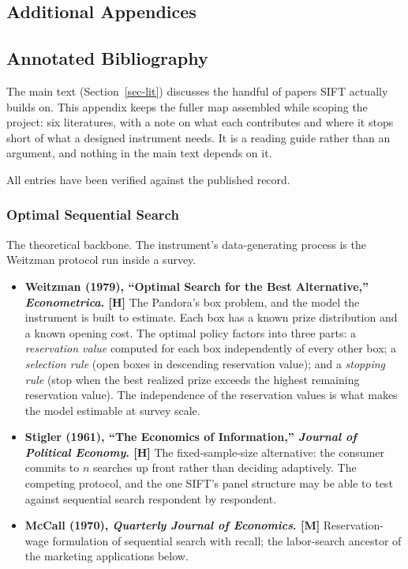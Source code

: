 \documentclass[
  letterpaper,
  DIV=11,
  numbers=noendperiod]{scrartcl}
\providecommand{\tightlist}{%
  \setlength{\itemsep}{0pt}\setlength{\parskip}{0pt}}
\begin{document}
\subsection{Additional Appendices}\label{additional-appendices}

\subsection{Annotated Bibliography}\label{sec-appendix-lit}

The main text (Section~\ref{sec-lit}) discusses the handful of papers
SIFT actually builds on. This appendix keeps the fuller map assembled
while scoping the project: six literatures, with a note on what each
contributes and where it stops short of what a designed instrument
needs. It is a reading guide rather than an argument, and nothing in the
main text depends on it.

All entries have been verified against the published record.

\subsubsection{Optimal Sequential Search}\label{sec-applit-theory}

The theoretical backbone. The instrument's data-generating process is
the Weitzman protocol run inside a survey.

\begin{itemize}
\tightlist
\item
  \textbf{Weitzman (1979), ``Optimal Search for the Best Alternative,''
  \emph{Econometrica}. {[}H{]}} The Pandora's box problem, and the model
  the instrument is built to estimate. Each box has a known prize
  distribution and a known opening cost. The optimal policy factors into
  three parts: a \emph{reservation value} computed for each box
  independently of every other box; a \emph{selection rule} (open boxes
  in descending reservation value); and a \emph{stopping rule} (stop
  when the best realized prize exceeds the highest remaining reservation
  value). The independence of the reservation values is what makes the
  model estimable at survey scale.
\item
  \textbf{Stigler (1961), ``The Economics of Information,''
  \emph{Journal of Political Economy}. {[}H{]}} The fixed-sample-size
  alternative: the consumer commits to \(n\) searches up front rather
  than deciding adaptively. The competing protocol, and the one SIFT's
  panel structure may be able to test against sequential search
  respondent by respondent.
\item
  \textbf{McCall (1970), \emph{Quarterly Journal of Economics}. {[}M{]}}
  Reservation-wage formulation of sequential search with recall; the
  labor-search ancestor of the marketing applications below.
\end{itemize}
\end{document}

